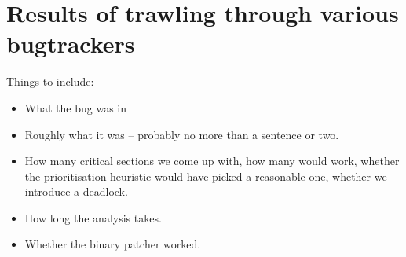 \documentclass[10pt,a4paper]{report}
\begin{document}
\section{Results of trawling through various bugtrackers}

Things to include:

\begin{itemize}
\item What the bug was in
\item Roughly what it was -- probably no more than a sentence or two.
\item How many critical sections we come up with, how many would work,
  whether the prioritisation heuristic would have picked a reasonable
  one, whether we introduce a deadlock.
\item How long the analysis takes.
\item Whether the binary patcher worked.
\end{itemize}
\end{document}

